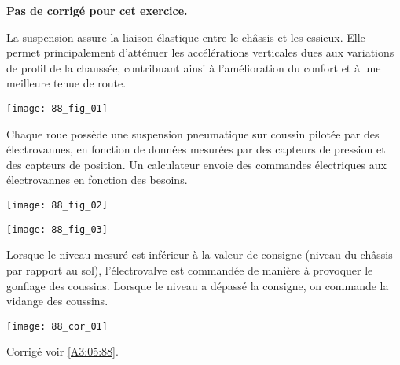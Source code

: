 \normaltrue \difficilefalse \tdifficilefalse
\correctionfalse

\setcounter{question}{0}
\ifcorrection
\else
\textbf{Pas de corrigé pour cet exercice.}
\fi



\ifprof
\else
La suspension assure la liaison élastique entre le châssis et les essieux. Elle permet principalement d’atténuer les accélérations verticales dues aux variations de profil de la chaussée, contribuant ainsi à l’amélioration du confort et à une meilleure tenue de route.

\begin{center}
\texttt{[image: 88\_fig\_01]}
\end{center}

Chaque roue possède une suspension pneumatique sur coussin pilotée par des électrovannes, en fonction de données mesurées par des capteurs de pression et des capteurs de position. Un calculateur envoie des commandes électriques aux électrovannes en fonction des besoins.

\begin{center}
\texttt{[image: 88\_fig\_02]}
\end{center}


\begin{center}
\texttt{[image: 88\_fig\_03]}
\end{center}

Lorsque le niveau mesuré est inférieur à la valeur de consigne (niveau du châssis par rapport au sol), l’électrovalve est commandée de manière à provoquer le gonflage des coussins.
Lorsque le niveau a dépassé la consigne, on commande la vidange des coussins.

\fi
{}
\ifprof
\begin{corrige}
\begin{center}
\texttt{[image: 88\_cor\_01]}
\end{center}
\end{corrige}
\else
\fi







\ifprof
\else
\begin{flushright}
\footnotesize{Corrigé  voir \ref{A3:05:88}.}
\end{flushright}%
\fi
